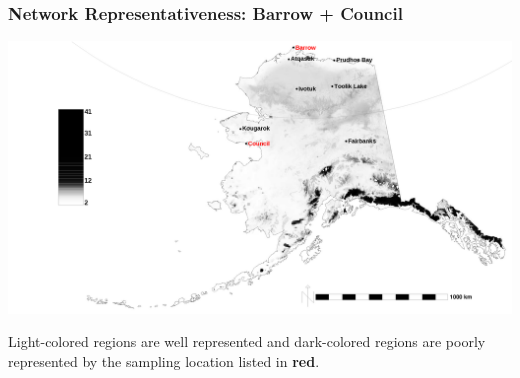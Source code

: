 %
%
%
\begin{frame}
 \frametitle{Network Representativeness: Barrow + Council}
 \includegraphics[width=\textwidth]{ngee_figures/Barrow-Councilness_2000-2009_on_2000-2009_point_global_dem_Feb2012_barscale.pdf} \\
  \vbox{\scriptsize\hfill\citep{Hoffman_LandscapeEcol_20131001}}

\medskip
Light-colored regions are well represented and dark-colored regions are
poorly represented by the sampling location listed in \textbf{\color{red}red}.
\end{frame}
%
